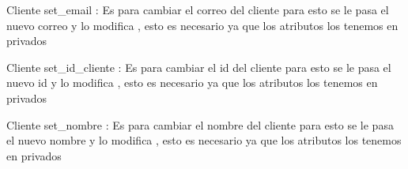 \documentclass[letterpaper,10pt,spanish]{sphinxmanual}
\begin{document}
\begin{fulllineitems}
\begin{fulllineitems}
\end{fulllineitems}


\begin{fulllineitems}
\label{\detokenize{proyect:proyect.Clientes.Cliente.set_email}}
\pysigstartsignatures
{}
\pysigstopsignatures
\sphinxAtStartPar
Cliente set\_email : Es para cambiar el correo del cliente para esto se le pasa el nuevo correo y lo modifica , esto es necesario ya que los atributos los tenemos en privados

\end{fulllineitems}


\begin{fulllineitems}
\label{\detokenize{proyect:proyect.Clientes.Cliente.set_id_cliente}}
\pysigstartsignatures
{}
\pysigstopsignatures
\sphinxAtStartPar
Cliente set\_id\_cliente : Es para cambiar el id del cliente para esto se le pasa el nuevo id y lo modifica , esto es necesario ya que los atributos los tenemos en privados

\end{fulllineitems}


\begin{fulllineitems}
\label{\detokenize{proyect:proyect.Clientes.Cliente.set_nombre}}
\pysigstartsignatures
{}
\pysigstopsignatures
\sphinxAtStartPar
Cliente set\_nombre : Es para cambiar el nombre del cliente para esto se le pasa el nuevo nombre y lo modifica , esto es necesario ya que los atributos los tenemos en privados

\end{fulllineitems}


\end{fulllineitems}
\end{document}
